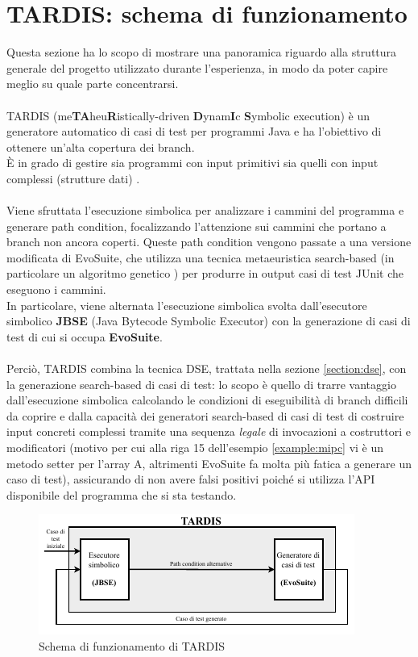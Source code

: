 \documentclass[a4paper, 12pt, oneside]{book}
\theoremstyle{normal}
\begin{document}
\section{TARDIS: schema di funzionamento}
Questa sezione ha lo scopo di mostrare una panoramica riguardo alla struttura generale del progetto utilizzato durante l'esperienza, in modo da poter capire meglio su quale parte concentrarsi. 
\\ \\ TARDIS \cite{braione2019sushi} (me\textbf{TA}heu\textbf{R}istically-driven \textbf{D}ynam\textbf{I}c \textbf{S}ymbolic execution) è un generatore automatico di casi di test per programmi Java e ha l'obiettivo di ottenere un'alta copertura dei branch. \\ È in grado di gestire sia programmi con input primitivi sia quelli con input complessi (strutture dati) \cite{braione2017combining}. \\ \\ Viene sfruttata l'esecuzione simbolica per analizzare i cammini del programma e generare path condition, focalizzando l'attenzione sui cammini che portano a branch non ancora coperti. Queste path condition vengono passate a una versione modificata di EvoSuite, che utilizza una tecnica metaeuristica search-based (in particolare un algoritmo genetico \cite{enwiki:1158719624}) per produrre in output casi di test JUnit che eseguono i cammini. \\ In particolare, viene alternata l'esecuzione simbolica svolta dall'esecutore simbolico \textbf{JBSE} (Java Bytecode Symbolic Executor) \cite{braione2016jbse} con la generazione di casi di test di cui si occupa \textbf{EvoSuite}. \\ \\ Perciò, TARDIS combina la tecnica DSE, trattata nella sezione \ref{section:dse}, con la generazione search-based di casi di test: lo scopo è quello di trarre vantaggio dall'esecuzione simbolica calcolando le condizioni di eseguibilità di branch difficili da coprire e dalla capacità dei generatori search-based di casi di test di costruire input concreti complessi tramite una sequenza \emph{legale} di invocazioni a costruttori e modificatori (motivo per cui alla riga 15 dell'esempio \ref{example:mipc} vi è un metodo setter per l'array A, altrimenti EvoSuite fa molta più fatica a generare un caso di test), assicurando di non avere falsi positivi poiché si utilizza l'API disponibile del programma che si sta testando.
\clearpage
\begin{figure}[h]
  \centering
  \includegraphics[width=\textwidth]{img/tardis-diagram.pdf}
  \caption{Schema di funzionamento di TARDIS}
  \label{diagram:tardis-workflow-no-classifier}
\end{figure}
\end{document}
